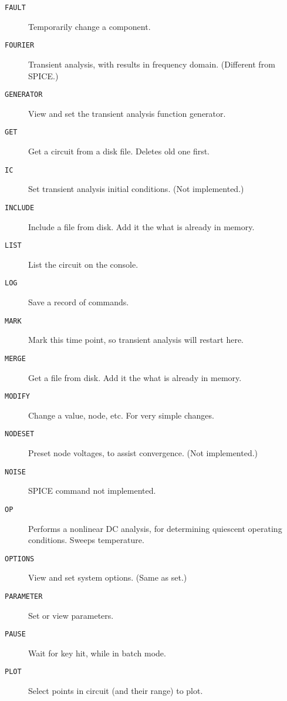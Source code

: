 \begin{description}
\item[{\tt FAULT}] Temporarily change a component.

\item[{\tt FOURIER}] Transient analysis, with results in
frequency domain.  (Different from SPICE.)

\item[{\tt GENERATOR}] View and set the transient analysis function
generator.

\item[{\tt GET}] Get a circuit from a disk file.  Deletes old one first.

\item[{\tt IC}] Set transient analysis initial conditions.
(Not implemented.)

\item[{\tt INCLUDE}] Include a file from disk.  Add it the what is
already in memory.

\item[{\tt LIST}] List the circuit on the console.

\item[{\tt LOG}] Save a record of commands.

\item[{\tt MARK}] Mark this time point, so transient analysis will restart
here.

\item[{\tt MERGE}] Get a file from disk.  Add it the what is already in
memory.

\item[{\tt MODIFY}] Change a value, node, etc.  For very simple changes.

\item[{\tt NODESET}] Preset node voltages, to assist convergence.  (Not
implemented.)

\item[{\tt NOISE}] SPICE command not implemented.

\item[{\tt OP}] Performs a nonlinear DC analysis, for determining quiescent
operating conditions.  Sweeps temperature.

\item[{\tt OPTIONS}] View and set system options.  (Same as set.)

\item[{\tt PARAMETER}] Set or view parameters.

\item[{\tt PAUSE}] Wait for key hit, while in batch mode.

\item[{\tt PLOT}] Select points in circuit (and their range) to plot.


\end{description}
